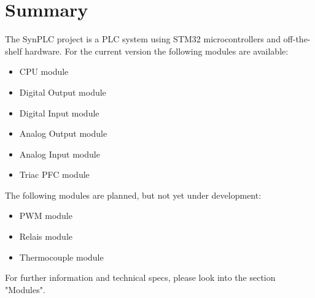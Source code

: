 \chapter{Summary}

The SynPLC project is a PLC system using STM32 microcontrollers and off-the-shelf hardware. For the current version the following modules are available:

\begin{itemize}
    \item CPU module
    \item Digital Output module
    \item Digital Input module
    \item Analog Output module
    \item Analog Input module
    \item Triac PFC module
\end{itemize}

The following modules are planned, but not yet under development:

\begin{itemize}
    \item PWM module
    \item Relais module
    \item Thermocouple module
\end{itemize}

For further information and technical specs, please look into the section  "Modules".

